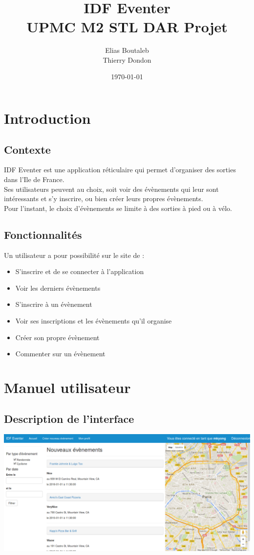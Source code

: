 \documentclass[11pt,a4paper,margin=0.5in]{report}
\title{IDF Eventer \\ UPMC M2 STL DAR Projet}
\author{Elias Boutaleb \\ Thierry Dondon}
\date{\today}
\begin{document}
\maketitle
\tableofcontents

\chapter{Introduction}

\section{Contexte}

IDF Eventer est une application réticulaire qui permet d'organiser des sorties dans l'Ile de France. \\
Ses utilisateurs peuvent au choix, soit voir des évènements qui leur sont intéressants et s'y inscrire, ou bien créer leurs propres évènements. \\
Pour l'instant, le choix d'évènements se limite à des sorties à pied ou à vélo.

\section{Fonctionnalités}

Un utilisateur a pour possibilité sur le site de :

\begin{itemize}
    \item S'inscrire et de se connecter à l'application
    \item Voir les derniers évènements
    \item S'inscrire à un évènement
    \item Voir ses inscriptions et les évènements qu'il organise
    \item Créer son propre évènement
    \item Commenter sur un évènement
\end{itemize}

\chapter{Manuel utilisateur}

\section{Description de l'interface}

\includegraphics[scale=0.33]{illus/main.png} \\[0.25in]
\end{document}
